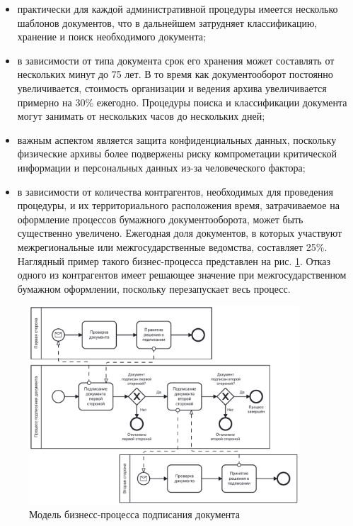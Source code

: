 \begin{itemize}[label=---]
	\item практически для каждой административной процедуры имеется несколько шаблонов документов, что в дальнейшем затрудняет классификацию, хранение и поиск необходимого документа;
	
	\item в зависимости от типа документа срок его хранения может составлять от нескольких минут до 75 лет\cite{dadaya}. В то время как документооборот постоянно увеличивается, стоимость организации и ведения архива увеличивается примерно на 30\% ежегодно. Процедуры поиска и классификации документа могут занимать от нескольких часов до нескольких дней;
	
	\item важным аспектом является защита конфиденциальных данных, поскольку физические архивы более подвержены риску компрометации критической информации и персональных данных из-за человеческого фактора;
	
	\item в зависимости от количества контрагентов, необходимых для проведения процедуры, и их территориального расположения время, затрачиваемое на оформление процессов бумажного документооборота, может быть существенно увеличено. Ежегодная доля документов, в которых участвуют межрегиональные или межгосударственные ведомства, составляет 25\%. Наглядный пример такого бизнес-процесса представлен на рис. \ref{fig:sign-flow}. Отказ одного из контрагентов имеет решающее значение при межгосударственном бумажном оформлении, поскольку перезапускает весь процесс.
\end{itemize}

\begin{figure}[h!btp]
	\centering
	\includegraphics[width=0.9\textwidth]{inc/sign_flow_bpmn.pdf}
	\caption{Модель бизнесс-процесса подписания документа}
	\label{fig:sign-flow}
\end{figure}

